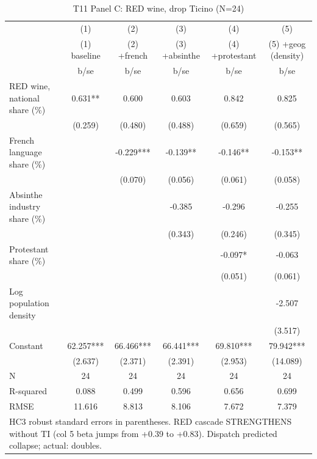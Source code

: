 \begin{table}[htbp]\centering
\def\sym#1{\ifmmode^{#1}\else\(^{#1}\)\fi}
\caption{T11 Panel C: RED wine, drop Ticino (N=24) \label{tab:T11\_C}}
\begin{tabular}{l*{5}{c}}
\toprule
            &\multicolumn{1}{c}{(1)}&\multicolumn{1}{c}{(2)}&\multicolumn{1}{c}{(3)}&\multicolumn{1}{c}{(4)}&\multicolumn{1}{c}{(5)}\\
            &\multicolumn{1}{c}{(1) baseline}&\multicolumn{1}{c}{(2) +french}&\multicolumn{1}{c}{(3) +absinthe}&\multicolumn{1}{c}{(4) +protestant}&\multicolumn{1}{c}{(5) +geog (density)}\\
            &        b/se   &        b/se   &        b/se   &        b/se   &        b/se   \\
\midrule
RED wine, national share (\%)&       0.631** &       0.600   &       0.603   &       0.842   &       0.825   \\
            &     (0.259)   &     (0.480)   &     (0.488)   &     (0.659)   &     (0.565)   \\
French language share (\%)&               &      -0.229***&      -0.139** &      -0.146** &      -0.153** \\
            &               &     (0.070)   &     (0.056)   &     (0.061)   &     (0.058)   \\
Absinthe industry share (\%)&               &               &      -0.385   &      -0.296   &      -0.255   \\
            &               &               &     (0.343)   &     (0.246)   &     (0.345)   \\
Protestant share (\%)&               &               &               &      -0.097*  &      -0.063   \\
            &               &               &               &     (0.051)   &     (0.061)   \\
Log population density&               &               &               &               &      -2.507   \\
            &               &               &               &               &     (3.517)   \\
Constant    &      62.257***&      66.466***&      66.441***&      69.810***&      79.942***\\
            &     (2.637)   &     (2.371)   &     (2.391)   &     (2.953)   &    (14.089)   \\
\midrule
N           &          24   &          24   &          24   &          24   &          24   \\
R-squared   &       0.088   &       0.499   &       0.596   &       0.656   &       0.699   \\
RMSE        &      11.616   &       8.813   &       8.106   &       7.672   &       7.379   \\
\bottomrule
\multicolumn{6}{l}{\footnotesize HC3 robust standard errors in parentheses.  RED cascade STRENGTHENS without TI (col 5 beta jumps from +0.39 to +0.83).  Dispatch predicted collapse; actual: doubles.}\\
\end{tabular}
\end{table}
